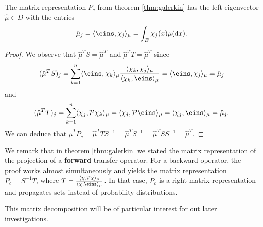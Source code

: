 \begin{thm}
\label{thm:lefteigenvector}
The matrix representation $P_c$ from theorem \ref{thm:galerkin} has the left eigenvector $\hat{\mu} \in D$ with the entries
\begin{equation*}
\hat{\mu}_j = \langle \eins, \chi_j \rangle_\mu = \int_E \chi_j(x) \mu(\diff x).
\end{equation*}
\end{thm}

\begin{proof}
We observe that $\hat{\mu}^T S = \hat{\mu}^T$ and $\hat{\mu}^T T = \hat{\mu}^T$ since
\begin{equation*}
(\hat{\mu}^T S)_j = \sum_{k=1}^n  \langle \eins, \chi_k \rangle_\mu \frac{\langle \chi_k, \chi_j \rangle_\mu}{\langle \chi_k, \eins \rangle_\mu}
= \langle \eins, \chi_j \rangle_\mu = \hat{\mu}_j
\end{equation*}
and
\begin{equation*}
(\hat{\mu}^T T)_j = \sum_{k=1}^n \langle \chi_j, \Pcal \chi_k \rangle_\mu = \langle \chi_j, \Pcal \eins \rangle_\mu
=  \langle \chi_j, \eins \rangle_\mu = \hat{\mu}_j.
\end{equation*}
We can deduce that $\hat{\mu}^T P_c = \hat{\mu}^T TS^{-1} = \hat{\mu}^T S^{-1} = \hat{\mu}^T SS^{-1} = \hat{\mu}^T$.
\end{proof}

\begin{rem}
We remark that in theorem \ref{thm:galerkin} we stated the matrix representation of the projection of a \textbf{forward} transfer operator.
For a backward operator, the proof works almost simultaneously and yields the matrix representation $P_c = S^{-1}T$, where $T = \frac{\langle \chi, \Pcal \chi \rangle_\mu}{\langle \chi, \eins \rangle_\mu}$. In that case, $P_c$ is a right matrix representation and propagates sets instead of probability distributions.
\end{rem}

This matrix decomposition will be of particular interest for out later investigations.

